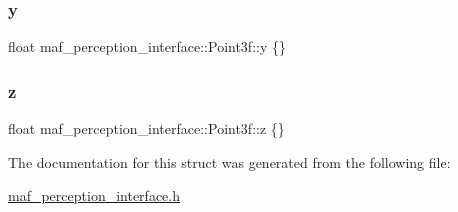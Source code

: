\subsubsection{\texorpdfstring{y}{y}}
{\footnotesize\ttfamily float maf\+\_\+perception\+\_\+interface\+::\+Point3f\+::y \{\}}

\mbox{\label{structmaf__perception__interface_1_1Point3f_ad31fcb8cf52d50dcf8cfe3a07d979f92}} 
\subsubsection{\texorpdfstring{z}{z}}
{\footnotesize\ttfamily float maf\+\_\+perception\+\_\+interface\+::\+Point3f\+::z \{\}}



The documentation for this struct was generated from the following file\+:\begin{DoxyCompactItemize}
\item 
\hyperlink{maf__perception__interface_8h}{maf\+\_\+perception\+\_\+interface.\+h}\end{DoxyCompactItemize}
